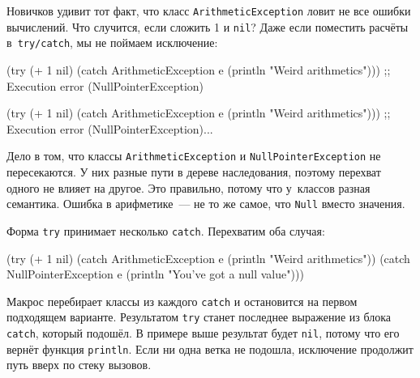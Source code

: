 Новичков удивит тот факт, что класс \texttt{Arith\-metic\-Excep\-tion} ловит не все
ошибки вычислений. Что случится, если сложить 1 и \verb|nil|? Даже если
поместить расчёты в~\verb|try/catch|, мы не поймаем исключение:

\ifnarrow

\begin{english}
  \begin{clojure}
(try
  (+ 1 nil)
  (catch ArithmeticException e
    (println "Weird arithmetics")))
;; Execution error (NullPointerException)
  \end{clojure}
\end{english}

\else

\begin{english}
  \begin{clojure}
(try
  (+ 1 nil)
  (catch ArithmeticException e
    (println "Weird arithmetics")))
;; Execution error (NullPointerException)...
  \end{clojure}
\end{english}

\fi


Дело в том, что классы \texttt{ArithmeticException} и
\texttt{Null\-Pointer\-Exception} не пересекаются. У них разные пути в дереве
наследования, поэтому перехват одного не влияет на другое. Это правильно, потому
что у~классов разная семантика. Ошибка в арифметике~--- не то же самое, что
\verb|Null| вместо значения.


Форма \verb|try| принимает несколько \verb|catch|. Перехватим оба случая:

\pagebreakafive

\begin{english}
  \begin{clojure}
(try
  (+ 1 nil)
  (catch ArithmeticException e
    (println "Weird arithmetics"))
  (catch NullPointerException e
    (println "You've got a null value")))
  \end{clojure}
\end{english}

Макрос перебирает классы из каждого \verb|catch| и остановится на первом
подходящем варианте. Результатом \verb|try| станет последнее выражение из блока
\verb|catch|, который подошёл. В примере выше результат будет \verb|nil|, потому
что его вернёт функция \verb|println|. Если ни одна ветка не подошла, исключение
продолжит путь вверх по стеку вызовов.

